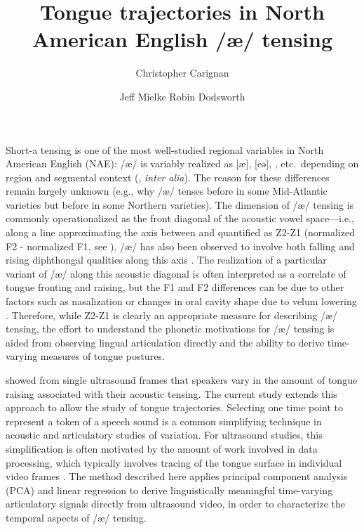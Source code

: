 \documentclass[output=paper]{LSP/langsci}
\author{Christopher Carignan\affiliation{North Carolina State University} \and Jeff Mielke\affiliation{North Carolina State University} \lastand Robin Dodsworth\affiliation{North Carolina State University}}
\title{Tongue trajectories in {N}orth {A}merican {E}nglish /æ/ tensing}
\begin{document}

Short-a tensing is one of the most well-studied regional variables in North American English (NAE): /æ/ is variably realized as [æ], [eə], , etc.~depending on region and segmental context 
(\citealp{ash_distribution_2002,becker_short-system_2009,boberg_regional_2008,boberg_short-cincinnati:_2000,labov_atlas_2006-1,plichta_interdisciplinary_2005}, \textit{inter alia}). The reason for these differences remain largely unknown (e.g., why /æ/ tenses before  in some Mid-Atlantic varieties but before  in some Northern varieties). The dimension of /æ/ tensing is commonly operationalized as the front diagonal of the acoustic vowel space---i.e., along a line approximating the axis between  and  quantified as Z2-Z1 (normalized F2 - normalized F1, see \citealt{labov_one_2013}). /æ/ has also been observed to involve both falling and rising diphthongal qualities along this axis \citep{assmann_time-varying_2000,fox_cross-dialectal_2009,labov_atlas_2006-1}. The realization of a particular variant of /æ/ along this acoustic diagonal is often interpreted as a correlate of tongue fronting and raising, but the F1 and F2 differences can be due to other factors such as nasalization \citep{decker_are_2012} or changes in oral cavity shape due to velum lowering \citep{baker_more_2008}. Therefore, while Z2-Z1 is clearly an appropriate measure for describing /æ/ tensing, the effort to understand the phonetic motivations for /æ/ tensing is aided from observing lingual articulation directly and the ability to derive time-varying measures of tongue postures. 

\citet{decker_are_2012} showed from single ultrasound frames that speakers vary in the amount of tongue raising associated with their acoustic tensing. The current study extends this approach to allow the study of tongue trajectories. Selecting one time point to represent a token of a speech sound is a common simplifying technique in acoustic and articulatory studies of variation.  For ultrasound studies, this simplification is often motivated by the amount of work involved in data processing, which typically involves tracing of the tongue surface in individual video frames \citep{li_automatic_2005}.
The method described here applies principal component analysis (PCA) and linear regression to derive linguistically meaningful time-varying articulatory signals directly from ultrasound video, in order to characterize the temporal aspects of /æ/ tensing.
\end{document}
